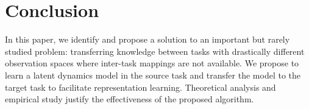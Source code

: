 \vspace{-0.5em}
\section{Conclusion}
\label{sec:conclusion}
\vspace{-0.5em}
In this paper, we identify and propose a solution to an important but rarely studied problem: transferring knowledge between tasks with drastically different observation spaces where inter-task mappings are not available. 
We propose to learn a latent dynamics model in the source task and transfer the model to the target task to facilitate representation learning. Theoretical analysis and empirical study justify the effectiveness of the proposed algorithm.
